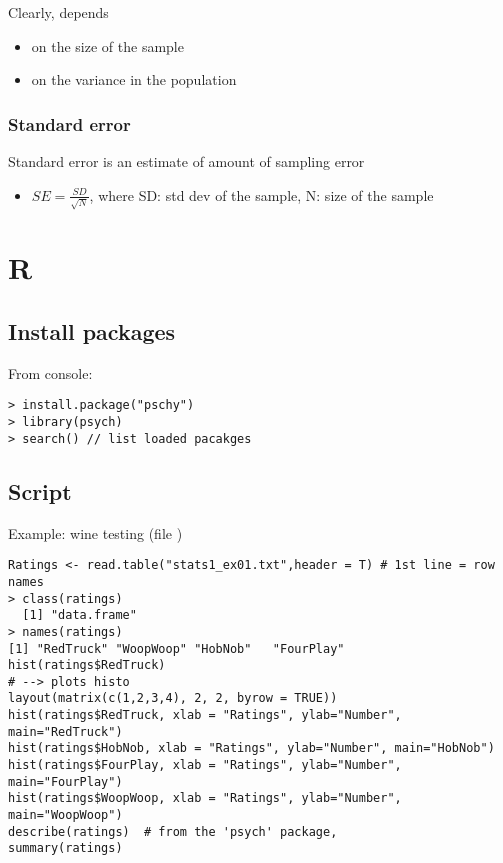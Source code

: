 \documentclass[11pt]{article}
\begin{document}
    Clearly, depends 
\begin{itemize}
\item on the size of the sample
\item on the variance in the population
\end{itemize}
\subsubsection{Standard error}
\label{sec-2-5-2}

    Standard error is an estimate of amount of sampling error
\begin{itemize}
\item $SE = \frac{SD}{\sqrt{N}}$, where SD: std dev of the sample, N: size of the sample
\end{itemize}
\section{R}
\label{sec-3}
\subsection{Install packages}
\label{sec-3-1}

   From console: 

\begin{verbatim}
> install.package("pschy")
> library(psych)
> search() // list loaded pacakges
\end{verbatim}
\subsection{Script}
\label{sec-3-2}

   Example: wine testing (file )

\begin{verbatim}
Ratings <- read.table("stats1_ex01.txt",header = T) # 1st line = row names
> class(ratings)
  [1] "data.frame"
> names(ratings)
[1] "RedTruck" "WoopWoop" "HobNob"   "FourPlay"
hist(ratings$RedTruck)
# --> plots histo
layout(matrix(c(1,2,3,4), 2, 2, byrow = TRUE))
hist(ratings$RedTruck, xlab = "Ratings", ylab="Number", main="RedTruck")
hist(ratings$HobNob, xlab = "Ratings", ylab="Number", main="HobNob")
hist(ratings$FourPlay, xlab = "Ratings", ylab="Number", main="FourPlay")
hist(ratings$WoopWoop, xlab = "Ratings", ylab="Number", main="WoopWoop")
describe(ratings)  # from the 'psych' package, 
summary(ratings)
\end{verbatim}
\end{document}
